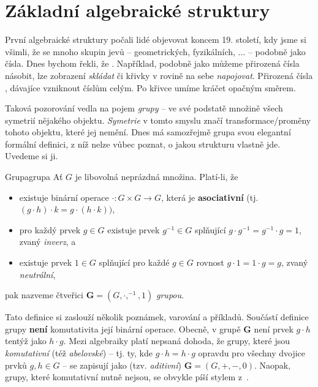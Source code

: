 \section{Základní algebraické struktury}
\label{sec:zakladni-algebraicke-struktury}

První algebraické struktury počali lidé objevovat koncem 19. století, kdy jsme
si všimli, že se mnoho skupin jevů -- geometrických, fyzikálních, ... --
 podobně jako čísla. Dnes bychom řekli, že . Například, podobně jako můžeme přirozená čísla násobit, lze zobrazení
\emph{skládat} či křivky v rovině na sebe \emph{napojovat}. Přirozená čísla
, dávajíce vzniknout číslům celým. Po křivce umíme kráčet opačným
směrem.

Taková pozorování vedla na pojem \emph{grupy} -- ve své podstatě množině všech
symetrií nějakého objektu. \emph{Symetrie} v tomto smyslu značí
transformace/proměny tohoto objektu, které jej nemění. Dnes má samozřejmě grupa
svou elegantní formální definici, z níž nelze vůbec poznat, o jakou strukturu
vlastně jde. Uvedeme si ji.

\begin{definition}{Grupa}{grupa}
 Ať $G$ je libovolná neprázdná množina. Platí-li, že
 \begin{itemize}
  \item existuje binární operace $ \cdot :G \times G \to G$, která je
  \textbf{asociativní} (tj. $(g \cdot h) \cdot k = g \cdot (h \cdot k))$,
 \item pro každý prvek $g \in G$ existuje prvek $g^{-1} \in G$ splňující
  $g \cdot g^{-1} = g^{-1} \cdot g = 1$, zvaný \emph{inverz}, a
 \item existuje prvek $1 \in G$ splňující pro každé $g \in G$ rovnost $g \cdot 1
  = 1 \cdot g = g$, zvaný \emph{neutrální},
 \end{itemize}
 pak nazveme čtveřici $\mathbf{G} = (G, \cdot ,^{-1},1)$ \emph{grupou}.
\end{definition}

Tato definice si zaslouží několik poznámek, varování a příkladů. Součástí
definice grupy \textbf{není} komutativita její binární operace. Obecně, v grupě
$\mathbf{G}$ není prvek $g \cdot h$ tentýž jako $h \cdot g$. Mezi algebraiky
platí nepsaná dohoda, že grupy, které jsou \emph{komutativní} (též
\emph{abelovské}) -- tj. ty, kde $g \cdot h = h \cdot g$ opravdu pro všechny
dvojice prvků $g,h \in G$ -- se zapisují jako (tzv. \emph{aditivní}) $\mathbf{G}
= (G,+,-,0)$. Naopak, grupy, které komutativní nutně nejsou, se obvykle píší
stylem z~.

